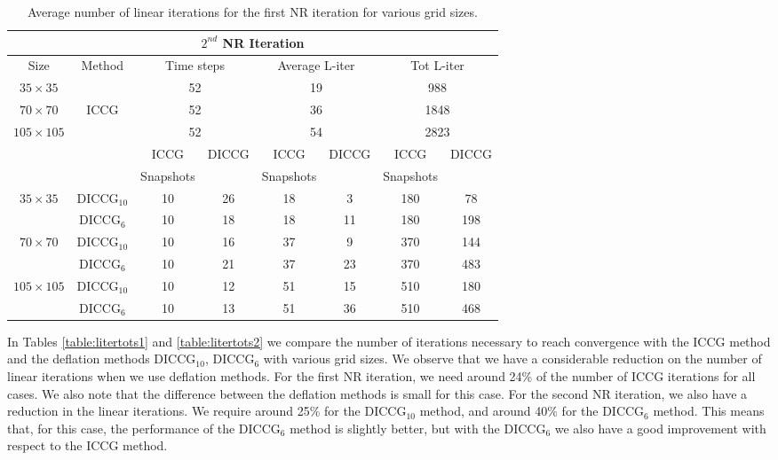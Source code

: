 \documentclass[12pt]{article}
\begin{document}
\begin{table}[!h]\centering
\begin{minipage}{1\textwidth}
\vspace{-10pt}
\centering
\begin{tabular}{ |c|c|c|c|c|c|c|c|} 
  \hline
 \multicolumn{8}{|c|}{$2^{nd}$ NR Iteration}  \\
\hline
Size&Method&  \multicolumn{2}{c|}{Time steps} &\multicolumn{2}{c|}{Average L-iter} & \multicolumn{2}{c|}{Tot L-iter}\\
\hline
$35\times35$& &\multicolumn{2}{c|}{52} & \multicolumn{2}{c|}{19}& \multicolumn{2}{c|}{988} \\

$70\times70$&ICCG&\multicolumn{2}{c|}{52}& \multicolumn{2}{c|}{36}& \multicolumn{2}{c|}{1848}\\

$105\times105$& & \multicolumn{2}{c|}{52} &\multicolumn{2}{c|}{54} & \multicolumn{2}{c|}{2823}\\
\hline
&&ICCG&DICCG&ICCG&DICCG&ICCG&DICCG\\
&&Snapshots&&Snapshots&&Snapshots&\\
\hline
$35\times35$&DICCG$_{10}$&10&26&18&3&180&78 \\
&DICCG$_6$&10&18&18&11&180&198 \\
\hline
$70\times70$&DICCG$_{10}$ &10&16&37&9&370&144 \\
&DICCG$_6$ &10&21&37&23&370&483\\
\hline
$105\times105$&DICCG$_{10}$ &10&12&51&15&510&180 \\
&DICCG$_6$&10&13&51&36&510&468 \\
\hline
 \end{tabular}
\caption{Average number of linear iterations for the first NR iteration for various grid sizes.}\label{table:liters2}
\end{minipage}
\end{table}

In Tables \ref{table:litertots1} and \ref{table:litertots2} we compare the number of iterations necessary to reach convergence with the ICCG method and the deflation methods DICCG$_{10}$, DICCG$_6$ with various grid sizes. We observe that we have a considerable reduction on the number of linear iterations when we use deflation methods. For the first NR iteration, we need around 24\% of the number of ICCG iterations for all cases. We also note that the difference between the deflation methods is small for this case. For the second NR iteration, we also have a reduction in the linear iterations. We require around 25\% for the DICCG$_{10}$ method, and around 40\% for the DICCG$_6$ method. This means that, for this case, the performance of the DICCG$_6$ method is slightly better, but with the DICCG$_6$ we also have a good improvement with respect to the ICCG method.   \\ \\
\end{document}
